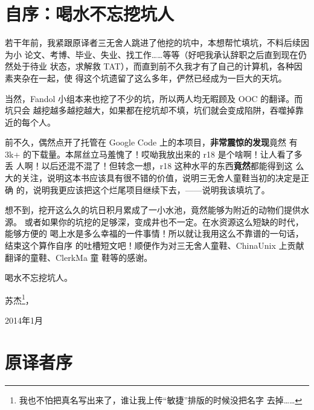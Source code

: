 


\chapter{自序：喝水不忘挖坑人}
\label{ch:ownPreface}

若干年前，我紧跟原译者三无舍人跳进了他挖的坑中，本想帮忙填坑，不料后续因为小
论文、考博、毕业、失业、找工作……等等（好吧我承认辞职之后直到现在仍然处于待业
状态，求解救 TAT），而直到前不久我才有了自己的计算机，各种因素夹杂在一起，使
得这个坑遗留了这么多年，俨然已经成为一巨大的天坑。

当然，Fandol 小组本来也挖了不少的坑，所以两人均无暇顾及 OOC 的翻译。而坑只会
越挖越多越挖越大，如果都在挖坑却不填，坑们就会变成陷阱，吞噬掉靠近的每个人。

前不久，偶然点开了托管在 Google Code 上的本项目，\textbf{非常震惊的发现}竟然
有 3k+ 的下载量。本屌丝立马羞愧了！哎呦我放出来的 r18 是个啥啊！让人看了多丢
人啊！以后还混不混了！但转念一想，r18 这种水平的东西\textbf{竟然}都能得到这
么大的关注，说明这本书应该具有很不错的价值，说明三无舍人童鞋当初的决定是正确
的，说明我更应该把这个烂尾项目继续下去，——说明我该填坑了。

想不到，挖开这么久的坑日积月累成了一小水池，竟然能够为附近的动物们提供水源。
或者如果你的坑挖的足够深，变成井也不一定。在水资源这么短缺的时代，能够方便的
喝上水是多么幸福的一件事情！所以就让我用这么不靠谱的一句话，结束这个算作自序
的吐槽短文吧！顺便作为对三无舍人童鞋、ChinaUnix 上贡献翻译的童鞋、ClerkMa 童
鞋等的感谢。

喝水不忘挖坑人。

\bigskip
\bigskip

\begin{flushright}
    苏杰\footnote{我也不怕把真名写出来了，谁让我上传“敏捷”排版的时候没把名字
    去掉……}，

    2014年1月
\end{flushright}

\chapter{原译者序}
\label{ch:TransPreface}

